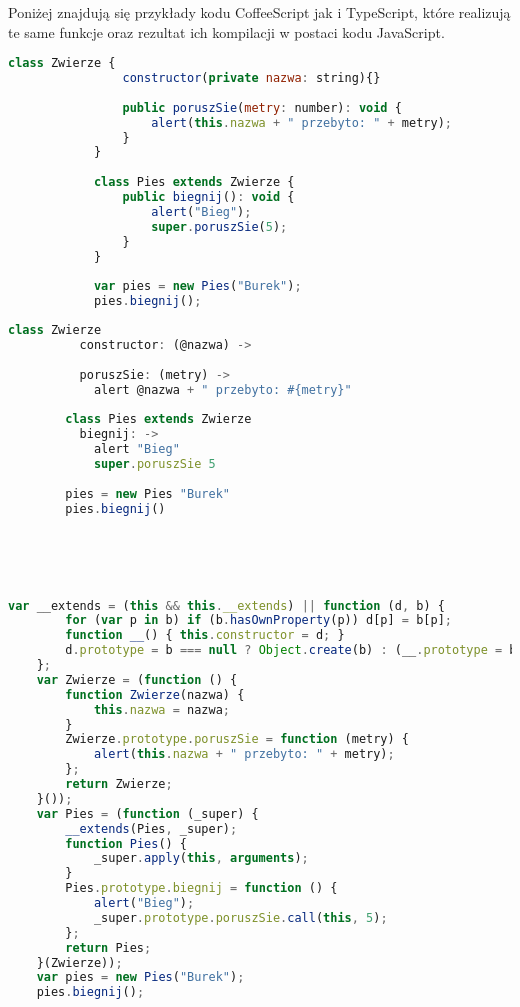 Poniżej znajdują się przykłady kodu CoffeeScript jak i TypeScript, które realizują te same funkcje oraz rezultat ich kompilacji w postaci kodu JavaScript. 
 
\begin{minipage}[t]{.50\linewidth}
\begin{lstlisting}[language=JavaScript,basicstyle=\small,frame=top,title={Kod TypeScript}]
			class Zwierze {
			    constructor(private nazwa: string){}
			    
				public poruszSie(metry: number): void {
					alert(this.nazwa + " przebyto: " + metry);
				}
			}
			
			class Pies extends Zwierze {
				public biegnij(): void {
					alert("Bieg");
					super.poruszSie(5);
				}
			}
			
			var pies = new Pies("Burek");
			pies.biegnij();
		\end{lstlisting}
\end{minipage} 
\begin{minipage}[t]{.50\linewidth}
\begin{lstlisting}[language=JavaScript,basicstyle=\small,frame=top,title={Kod CoffeeScript}]
		class Zwierze
		  constructor: (@nazwa) ->
		
		  poruszSie: (metry) ->
		    alert @nazwa + " przebyto: #{metry}"
		
		class Pies extends Zwierze
		  biegnij: ->
		    alert "Bieg"
		    super.poruszSie 5
		    
		pies = new Pies "Burek"
		pies.biegnij()
		 
\end{lstlisting}
\end{minipage}
\\\\
\begin{lstlisting}[language=JavaScript,basicstyle=\small,frame=top,title={Kod JavaScript}]
	var __extends = (this && this.__extends) || function (d, b) {
	    for (var p in b) if (b.hasOwnProperty(p)) d[p] = b[p];
	    function __() { this.constructor = d; }
	    d.prototype = b === null ? Object.create(b) : (__.prototype = b.prototype, new __());
	};
	var Zwierze = (function () {
	    function Zwierze(nazwa) {
	        this.nazwa = nazwa;
	    }
	    Zwierze.prototype.poruszSie = function (metry) {
	        alert(this.nazwa + " przebyto: " + metry);
	    };
	    return Zwierze;
	}());
	var Pies = (function (_super) {
	    __extends(Pies, _super);
	    function Pies() {
	        _super.apply(this, arguments);
	    }
	    Pies.prototype.biegnij = function () {
	        alert("Bieg");
	        _super.prototype.poruszSie.call(this, 5);
	    };
	    return Pies;
	}(Zwierze));
	var pies = new Pies("Burek");
	pies.biegnij();
\end{lstlisting} 	

